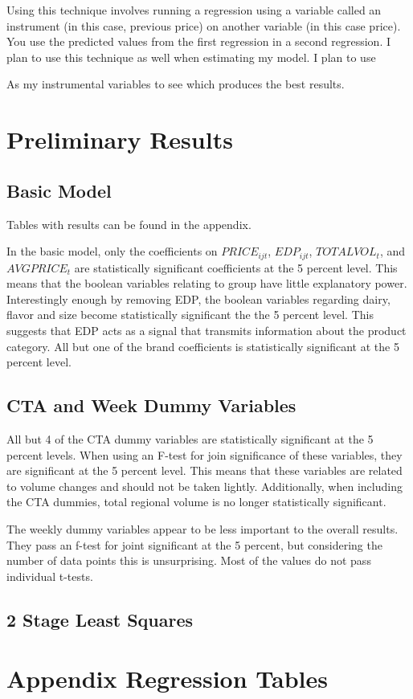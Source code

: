 \documentclass{article}
\begin{document}
Using this technique involves running a regression using a variable called an instrument (in this case, previous price) on another variable (in this case price). You use the predicted values from the first regression in a second regression.  I plan to use this technique as well when estimating my model. I plan to use 


As my instrumental variables to see which produces the best results.

\section{Preliminary Results}

\subsection{Basic Model}

Tables with results can be found in the appendix.

In the basic model, only the coefficients on ${PRICE}_{ijt}$, ${EDP}_{ijt}$, ${TOTALVOL}_t $, and ${AVGPRICE}_{t}$ are statistically significant coefficients at the 5 percent level. This means that the boolean variables relating to group have little explanatory power. Interestingly enough by removing EDP, the boolean variables regarding dairy, flavor and size become statistically significant the the 5 percent level. This suggests that EDP acts as a signal that transmits information about the product category. All but one of the brand coefficients is statistically significant at the 5 percent level.


\subsection{CTA and Week Dummy Variables}

All but 4 of the CTA dummy variables are statistically significant at the 5 percent levels. When using an F-test for join significance of these variables, they are significant at the 5 percent level. This means that these variables are related to volume changes and should not be taken lightly. Additionally, when including the CTA dummies, total regional volume is no longer statistically significant. 

The weekly dummy variables appear to be less important to the overall results. They pass an f-test for joint significant at the 5 percent, but considering the number of data points this is unsurprising. Most of the values do not pass individual t-tests.

\subsection{2 Stage Least Squares}

{}


\appendix

\section{Appendix Regression Tables}
\end{document}
